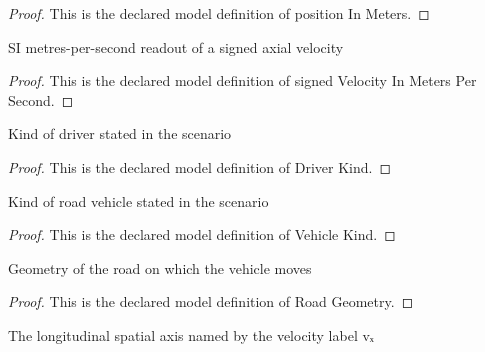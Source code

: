 \begin{proof}
  This is the declared model definition of position In Meters.
\end{proof}
\begin{definition}
  \label{def:physics:phyx-mini-0671:phyxminiproblems-problemphyxmini0671-signedvelocityinmeterspersecond}
  SI metres-per-second readout of a signed axial velocity
\end{definition}
\begin{proof}
  This is the declared model definition of signed Velocity In Meters Per Second.
\end{proof}
\begin{definition}
  \label{def:physics:phyx-mini-0671:phyxminiproblems-problemphyxmini0671-driverkind}
  Kind of driver stated in the scenario
\end{definition}
\begin{proof}
  This is the declared model definition of Driver Kind.
\end{proof}
\begin{definition}
  \label{def:physics:phyx-mini-0671:phyxminiproblems-problemphyxmini0671-vehiclekind}
  Kind of road vehicle stated in the scenario
\end{definition}
\begin{proof}
  This is the declared model definition of Vehicle Kind.
\end{proof}
\begin{definition}
  \label{def:physics:phyx-mini-0671:phyxminiproblems-problemphyxmini0671-roadgeometry}
  Geometry of the road on which the vehicle moves
\end{definition}
\begin{proof}
  This is the declared model definition of Road Geometry.
\end{proof}
\begin{definition}
  \label{def:physics:phyx-mini-0671:phyxminiproblems-problemphyxmini0671-motionaxis}
  The longitudinal spatial axis named by the velocity label vₓ
\end{definition}
